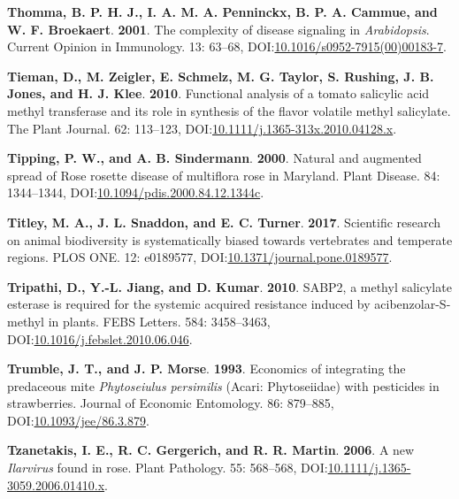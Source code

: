 \documentclass[12pt,final,CPage]{ufthesis}
\newlength{\cslhangindent}
\newenvironment{CSLReferences}[2] %
{%
	\setlength{\parindent}{0pt}
	\ifodd #1 \everypar{\setlength{\hangindent}{\cslhangindent}}\ignorespaces\fi
	\ifnum #2 > 0
	\setlength{\parskip}{#2\baselineskip}
	\fi
}%
{}
\begin{document}
{\begin{CSLReferences}{1}{0}
  \leavevmode{}%
  \textbf{Thomma, B. P. H. J., I. A. M. A. Penninckx, B. P. A. Cammue, and W. F. Broekaert}. \textbf{2001}. The complexity of disease signaling in {\emph{Arabidopsis}}. Current Opinion in Immunology. 13: 63--68, DOI:\href{https://doi.org/10.1016/s0952-7915(00)00183-7}{10.1016/s0952-7915(00)00183-7}.

  \leavevmode{}%
  \textbf{Tieman, D., M. Zeigler, E. Schmelz, M. G. Taylor, S. Rushing, J. B. Jones, and H. J. Klee}. \textbf{2010}. Functional analysis of a tomato salicylic acid methyl transferase and its role in synthesis of the flavor volatile methyl salicylate. The Plant Journal. 62: 113--123, DOI:\href{https://doi.org/10.1111/j.1365-313x.2010.04128.x}{10.1111/j.1365-313x.2010.04128.x}.

  \leavevmode{}%
  \textbf{Tipping, P. W., and A. B. Sindermann}. \textbf{2000}. Natural and augmented spread of {Rose rosette disease} of multiflora rose in {Maryland}. Plant Disease. 84: 1344--1344, DOI:\href{https://doi.org/10.1094/pdis.2000.84.12.1344c}{10.1094/pdis.2000.84.12.1344c}.

  \leavevmode{}%
  \textbf{Titley, M. A., J. L. Snaddon, and E. C. Turner}. \textbf{2017}. Scientific research on animal biodiversity is systematically biased towards vertebrates and temperate regions. {PLOS} {ONE}. 12: e0189577, DOI:\href{https://doi.org/10.1371/journal.pone.0189577}{10.1371/journal.pone.0189577}.

  \leavevmode{}%
  \textbf{Tripathi, D., Y.-L. Jiang, and D. Kumar}. \textbf{2010}. {SABP}2, a methyl salicylate esterase is required for the systemic acquired resistance induced by acibenzolar-{S}-methyl in plants. {FEBS} Letters. 584: 3458--3463, DOI:\href{https://doi.org/10.1016/j.febslet.2010.06.046}{10.1016/j.febslet.2010.06.046}.

  \leavevmode{}%
  \textbf{Trumble, J. T., and J. P. Morse}. \textbf{1993}. Economics of integrating the predaceous mite {\emph{Phytoseiulus persimilis}} ({{Acari}: {Phytoseiidae}}) with pesticides in strawberries. Journal of Economic Entomology. 86: 879--885, DOI:\href{https://doi.org/10.1093/jee/86.3.879}{10.1093/jee/86.3.879}.

  \leavevmode{}%
  \textbf{Tzanetakis, I. E., R. C. Gergerich, and R. R. Martin}. \textbf{2006}. A new {\emph{Ilarvirus}} found in rose. Plant Pathology. 55: 568--568, DOI:\href{https://doi.org/10.1111/j.1365-3059.2006.01410.x}{10.1111/j.1365-3059.2006.01410.x}.


\end{CSLReferences}}
\end{document}
